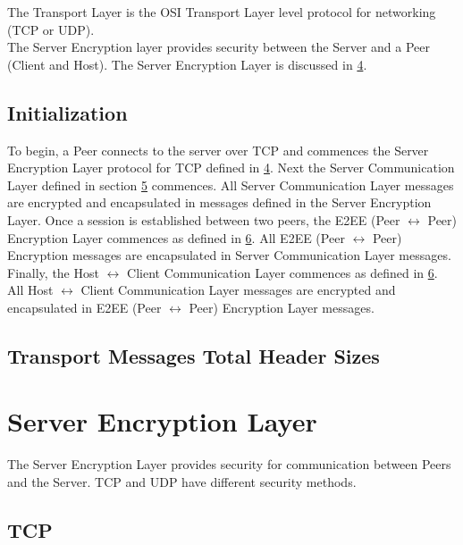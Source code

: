 \documentclass{article}
\begin{document}
    The Transport Layer is the OSI Transport Layer level protocol for networking (TCP or UDP). \\

    The Server Encryption layer provides security between the Server and a Peer (Client and Host). The Server
    Encryption Layer is discussed in \hyperlink{section.4}{4}.

    \subsection{Initialization}

    To begin, a Peer connects to the server over TCP and commences the Server Encryption Layer protocol for TCP
    defined in \hyperlink{section.4}{4}. Next the Server Communication Layer defined in section \hyperlink{section
    .5}{5} commences. All Server Communication Layer messages are encrypted and encapsulated in messages defined in
    the Server Encryption Layer. Once a session is established between two peers, the E2EE (Peer $\leftrightarrow$ Peer)
    Encryption Layer commences as defined in \hyperlink{section.6}{6}. All E2EE (Peer $\leftrightarrow$ Peer)
    Encryption messages are encapsulated in Server Communication Layer messages. Finally, the Host $\leftrightarrow$
    Client Communication Layer commences as defined in \hyperlink{section.6}{6}. All Host $\leftrightarrow$ Client
    Communication Layer messages are encrypted and encapsulated in E2EE (Peer $\leftrightarrow$ Peer) Encryption
    Layer messages.

    \subsection{Transport Messages Total Header Sizes}


    \newpage


    \section{Server Encryption Layer}

    The Server Encryption Layer provides security for communication between Peers and the Server. TCP and UDP have
    different security methods.

    \subsection{TCP}
\end{document}
